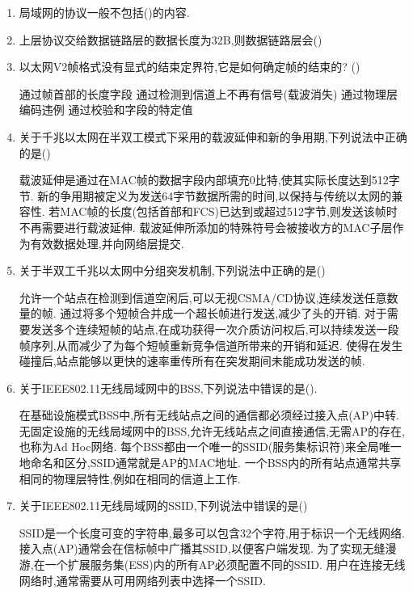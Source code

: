 \documentclass[12pt, a4paper, oneside, UTF8]{ctexbook}
\begin{document}
\begin{enumerate}
    \item 局域网的协议一般不包括(\qquad)的内容.
    \item 上层协议交给数据链路层的数据长度为32B,则数据链路层会(\qquad)
    \item 以太网V2帧格式没有显式的结束定界符,它是如何确定帧的结束的? (\qquad)
    \begin{choices}[1]
    \task 通过帧首部的长度字段
    \task 通过检测到信道上不再有信号(载波消失)
    \task 通过物理层编码违例
    \task 通过校验和字段的特定值
    \end{choices}

    \item 关于千兆以太网在半双工模式下采用的载波延伸和新的争用期,下列说法中正确的是(\qquad)
    \begin{choices}[1]
    \task 载波延伸是通过在MAC帧的数据字段内部填充0比特,使其实际长度达到512字节.
    \task 新的争用期被定义为发送64字节数据所需的时间,以保持与传统以太网的兼容性.
    \task 若MAC帧的长度(包括首部和FCS)已达到或超过512字节,则发送该帧时不再需要进行载波延伸.
    \task 载波延伸所添加的特殊符号会被接收方的MAC子层作为有效数据处理,并向网络层提交.
    \end{choices}

    \item 关于半双工千兆以太网中分组突发机制,下列说法中正确的是(\qquad)
    \begin{choices}[1]
    \task 允许一个站点在检测到信道空闲后,可以无视CSMA/CD协议,连续发送任意数量的帧.
    \task 通过将多个短帧合并成一个超长帧进行发送,减少了头的开销.
    \task 对于需要发送多个连续短帧的站点,在成功获得一次介质访问权后,可以持续发送一段帧序列,从而减少了为每个短帧重新竞争信道所带来的开销和延迟.
    \task 使得在发生碰撞后,站点能够以更快的速率重传所有在突发期间未能成功发送的帧.
    \end{choices}

    \item 关于IEEE802.11无线局域网中的BSS,下列说法中错误的是(\qquad).
    \begin{choices}[1]
    \task 在基础设施模式BSS中,所有无线站点之间的通信都必须经过接入点(AP)中转.
    \task 无固定设施的无线局域网中的BSS,允许无线站点之间直接通信,无需AP的存在,也称为Ad Hoc网络.
    \task 每个BSS都由一个唯一的SSID(服务集标识符)来全局唯一地命名和区分,SSID通常就是AP的MAC地址.
    \task 一个BSS内的所有站点通常共享相同的物理层特性,例如在相同的信道上工作.
    \end{choices}

    \item 关于IEEE802.11无线局域网的SSID,下列说法中错误的是(\qquad)
    \begin{choices}[1]
    \task SSID是一个长度可变的字符串,最多可以包含32个字符,用于标识一个无线网络.
    \task 接入点(AP)通常会在信标帧中广播其SSID,以便客户端发现.
    \task 为了实现无缝漫游,在一个扩展服务集(ESS)内的所有AP必须配置不同的SSID.
    \task 用户在连接无线网络时,通常需要从可用网络列表中选择一个SSID.
    \end{choices}


\end{enumerate}
\end{document}
